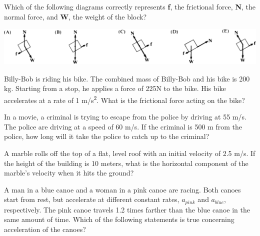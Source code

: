 \documentclass[10pt]{examdesign}
\begin{document}
\begin{multiplechoice} [title={Multiple Choice},
	rearrange=yes]
\begin{question}
	
	Which of the following diagrams correctly represents \textbf{f}, the frictional force, \textbf{N}, the normal force, and \textbf{W}, the weight of the block?
	
	\includegraphics[height={0.75in}]{incpa.png}
\end{question}


\begin{question}
	Billy-Bob is riding his bike.  The combined mass of Billy-Bob and his bike is 200 kg.  Starting from a stop, he applies a force of 225N to the bike.  His bike accelerates at a rate of 1 m/s\textsuperscript{2}.  What is the frictional force acting on the bike? 
\end{question}



\begin{question}
	In a movie, a criminal is trying to escape from the police by driving at 55 m/s. The police are driving at a speed of 60 m/s.  If the criminal is 500 m from the police, how long will it take the police to catch up to the criminal?  
\end{question}



\begin{question}
	A marble rolls off the top of a flat, level roof with an initial velocity of 2.5 m/s.  If the height of the building is 10 meters, what is the horizontal component of the marble's velocity when it hits the ground?
\end{question}


\begin{question}
	 A man in a blue canoe and a woman in a pink canoe are racing.  Both canoes start from rest, but accelerate at different constant rates, $a_{pink}$ and $a_{blue}$, respectively.  The pink canoe travels 1.2 times farther than the blue canoe in the same amount of time. Which of the following statements is true concerning acceleration of the canoes?
\end{question}




\end{multiplechoice}
\end{document}
